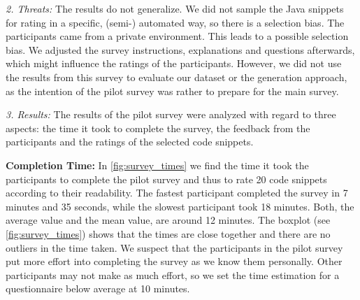 \documentclass[%
class=scrreprt,
chapterprefix=false,%
open=right,%
twoside=false,%
paper=a4,%
logofile={Logo\_zentral\_farbig\_EN.png},%
thesistype=master,%
UKenglish,%
]{se2thesis}
\theoremstyle{definition}
\begin{document}
	\textit{2. Threats:}
	The results do not generalize. We did not sample the Java snippets for rating in a specific, (semi-) automated way, so there is a selection bias. The participants came from a private environment. This leads to a possible selection bias.
	We adjusted the survey instructions, explanations and questions afterwards, which might influence the ratings of the participants.
	However, we did not use the results from this survey to evaluate our dataset or the generation approach, as the intention of the pilot survey was rather to prepare for the main survey. 
	
	\textit{3. Results:}
	The results of the pilot survey were analyzed with regard to three aspects: the time it took to complete the survey, the feedback from the participants and the ratings of the selected code snippets.
	
	\textbf{Completion Time:} 
	In \autoref{fig:survey_times} we find the time it took the participants to complete the pilot survey and thus to rate 20 code snippets according to their readability. 
	The fastest participant completed the survey in 7 minutes and 35 seconds, while the slowest participant took 18 minutes. 
	Both, the average value and the mean value, are around 12 minutes. The boxplot (see \autoref{fig:survey_times}) shows that the times are close together and there are no outliers in the time taken.
	We suspect that the participants in the pilot survey put more effort into completing the survey as we know them personally. 
	Other participants may not make as much effort, so we set the time estimation for a questionnaire below average at 10 minutes.
		
\end{document}
